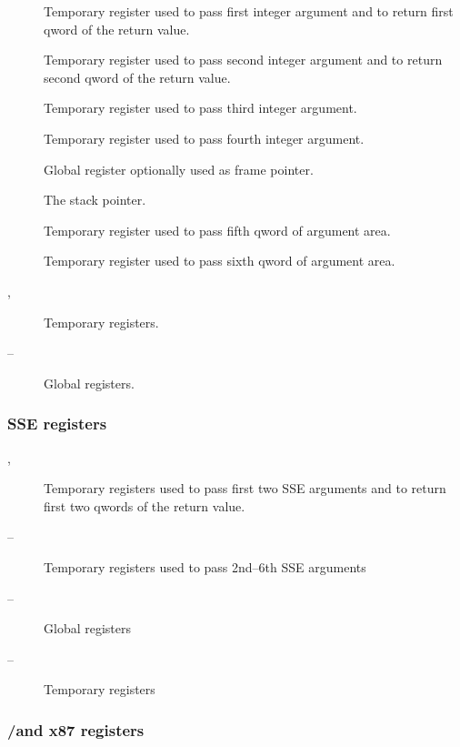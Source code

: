 \begin{description}
  \item [\RAX]
    Temporary register used to pass first integer argument and to return
    first qword of the return value.
  \item [\RDX]
    Temporary register used to pass second integer argument
    and to return second qword of the return value.
  \item [\RCX] Temporary register used to pass third integer argument.
  \item [\RBX] Temporary register used to pass fourth integer argument.
  \item [\RBP] Global register optionally used as frame pointer.
  \item [\RSP] The stack pointer.
  \item [\RSI]
    Temporary register used to pass fifth qword of argument area.
  \item [\RDI] 
    Temporary register used to pass sixth qword of argument area.
  \item [, ] Temporary registers.
  \item [ -- ] Global registers.
\end{description}

\subsubsection {SSE registers}

\begin{description}
  \item [, ] Temporary registers used to pass first two SSE arguments
    and to return first two qwords of the return value.
  \item [ -- ] Temporary registers used to pass 2nd--6th SSE arguments
  \item [ -- ] Global registers
  \item [ -- ] Temporary registers
\end{description}

\subsubsection {\MMX/\threednow and x87 registers}

